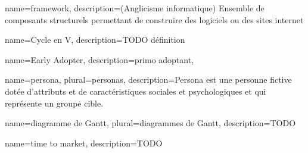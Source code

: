 
\begin{comment}
Glossaire : 
  Nouvelle entrée :
    \newglossaryentry{test} %
    {%
        name={test}, %
        description={<description>}, %
        plural={tests} %
    }
  Usage : 
    \gls{test} Retourne "test"
    \Gls{test} Retourne "Test"
    \glsplural{test} Retourne "tests"
    \Glsplural{test} Retourne "Tests"
        
Pour des mots utilisés fréquemment, petite astuce : 
	\newcommand{\bsr}{bilan scientifique régional} 
Ensuite, dans le contenu, il suffit d'y faire référence comme ceci : "\bsr{}"
\end{comment}


{%
    name={framework},
    description={(Anglicisme informatique) Ensemble de composants structurels permettant de construire des logiciels ou des sites internet}
}

{%
	name={Cycle en V},
	description={TODO définition}
}

{%
	name={Early Adopter},
	description={primo adoptant},
}

{
	name={persona},
	plural={personas},
	description={Persona est une personne fictive dotée d'attributs et de caractéristiques sociales et psychologiques et qui représente un groupe cible. }
}

{
	name={diagramme de Gantt},
	plural={diagrammes de Gantt},
	description={TODO}
}

{
	name={time to market},
	description={TODO}
}




\newcommand{\bv}{Bureau Veritas}
\newcommand{\na}{Nouvelle-Aquitaine}
\newcommand{\onepoint}{onepoint}
\newcommand{\naq}{Nouvelle-Aquitaine}
\newcommand{\problematique}{Comment l'automatisation peut-elle permettre d'améliorer le cycle de vie d'une application ?}
\newcommand{\drupal}{Drupal}
\newcommand{\etsy}{Etsy}